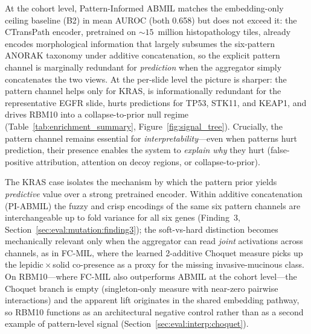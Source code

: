At the cohort level, Pattern-Informed ABMIL matches the
embedding-only ceiling baseline (B2) in mean AUROC (both
0.658) but does not exceed it: the CTransPath encoder, pretrained
on ${\sim}15$~million histopathology tiles, already encodes
morphological information that largely subsumes the six-pattern
ANORAK taxonomy under additive concatenation, so the explicit
pattern channel is marginally redundant for \emph{prediction} when
the aggregator simply concatenates the two views.
At the per-slide level the picture is sharper: the pattern channel
helps only for KRAS, is informationally redundant for the
representative EGFR slide, hurts predictions for TP53, STK11, and
KEAP1, and drives RBM10 into a collapse-to-prior null regime
(Table~\ref{tab:enrichment_summary},
Figure~\ref{fig:signal_tree}).
Crucially, the pattern channel remains essential for
\emph{interpretability}---even when patterns hurt prediction, their
presence enables the system to \emph{explain why} they hurt
(false-positive attribution, attention on decoy regions, or
collapse-to-prior).

The KRAS case isolates the mechanism by which the pattern prior
yields \emph{predictive} value over a strong pretrained encoder.
Within additive concatenation (PI-ABMIL) the fuzzy and crisp
encodings of the same six pattern channels are interchangeable up
to fold variance for all six genes (Finding~3,
Section~\ref{sec:eval:mutation:finding3}); the soft-vs-hard
distinction becomes mechanically relevant only when the aggregator
can read \emph{joint} activations across channels, as in FC-MIL,
where the learned 2-additive Choquet measure picks up the
lepidic\,$\times$\,solid co-presence as a proxy for the missing
invasive-mucinous class.
On RBM10---where FC-MIL also outperforms ABMIL at the cohort
level---the Choquet branch is empty (singleton-only measure with
near-zero pairwise interactions) and the apparent lift originates
in the shared embedding pathway, so RBM10 functions as an
architectural negative control rather than as a second example of
pattern-level signal
(Section~\ref{sec:eval:interp:choquet}).

